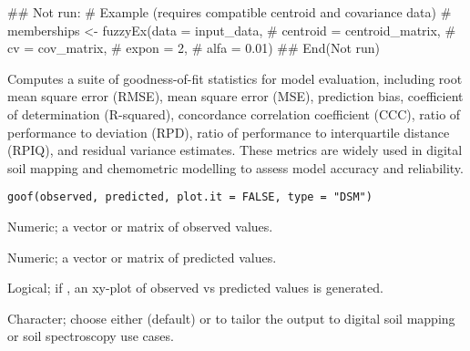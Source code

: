 \documentclass[a4paper]{book}
\begin{document}
%
\begin{Examples}
\begin{ExampleCode}
## Not run: 
# Example (requires compatible centroid and covariance data)
# memberships <- fuzzyEx(data = input_data, 
#                        centroid = centroid_matrix, 
#                        cv = cov_matrix, 
#                        expon = 2, 
#                        alfa = 0.01)
## End(Not run)
\end{ExampleCode}
\end{Examples}
%
\begin{Description}
Computes a suite of goodness-of-fit statistics for model evaluation, including root mean square error (RMSE), mean square error (MSE), prediction bias, coefficient of determination (R-squared), concordance correlation coefficient (CCC), ratio of performance to deviation (RPD), ratio of performance to interquartile distance (RPIQ), and residual variance estimates. These metrics are widely used in digital soil mapping and chemometric modelling to assess model accuracy and reliability.
\end{Description}
%
\begin{Usage}
\begin{verbatim}
goof(observed, predicted, plot.it = FALSE, type = "DSM")
\end{verbatim}
\end{Usage}
%
\begin{Arguments}
\begin{ldescription}
\item[\code{observed}] Numeric; a vector or matrix of observed values.
\item[\code{predicted}] Numeric; a vector or matrix of predicted values.
\item[\code{plot.it}] Logical; if , an xy-plot of observed vs predicted values is generated.
\item[\code{type}] Character; choose either  (default) or  to tailor the output to digital soil mapping or soil spectroscopy use cases.
\end{ldescription}
\end{Arguments}
%
\end{document}
